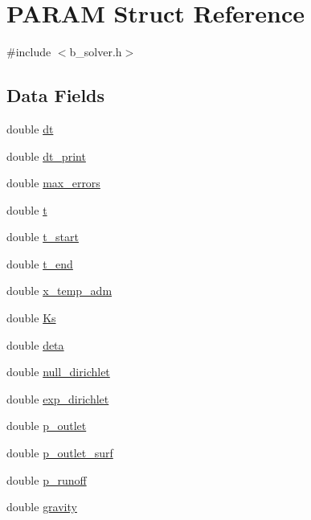 \hypertarget{struct_p_a_r_a_m}{\section{P\-A\-R\-A\-M Struct Reference}
\label{struct_p_a_r_a_m}
}


{\ttfamily \#include $<$b\-\_\-solver.\-h$>$}

\subsection*{Data Fields}
\begin{DoxyCompactItemize}
\item 
double \hyperlink{struct_p_a_r_a_m_a0348912407bf4a61261b92feccdaf092}{dt}
\item 
double \hyperlink{struct_p_a_r_a_m_af11d7ff309c45584f064aaf31ce0bfae}{dt\-\_\-print}
\item 
double \hyperlink{struct_p_a_r_a_m_ac69e7b750bf4a304aa03871456e5345d}{max\-\_\-errors}
\item 
double \hyperlink{struct_p_a_r_a_m_a8a3cde045b4e45360640476e83c239d8}{t}
\item 
double \hyperlink{struct_p_a_r_a_m_a50360071f78d7a9b7a009e6efc6c82cb}{t\-\_\-start}
\item 
double \hyperlink{struct_p_a_r_a_m_a93e536551277d6840879ceb33bb20a33}{t\-\_\-end}
\item 
double \hyperlink{struct_p_a_r_a_m_a0b65307c9584f0783adc40141903c39a}{x\-\_\-temp\-\_\-adm}
\item 
double \hyperlink{struct_p_a_r_a_m_a67b007dbf2132a03148c0a8407348e98}{Ks}
\item 
double \hyperlink{struct_p_a_r_a_m_af23ff99642425900011aff1b51438e43}{deta}
\item 
double \hyperlink{struct_p_a_r_a_m_a0ed670f674e3fdb1657eb6c40aed2a75}{null\-\_\-dirichlet}
\item 
double \hyperlink{struct_p_a_r_a_m_aa2aedc005e74a667c46a2c9989d4bf5c}{exp\-\_\-dirichlet}
\item 
double \hyperlink{struct_p_a_r_a_m_ab9e16ccc88b168342b0a6a2fe1bb7070}{p\-\_\-outlet}
\item 
double \hyperlink{struct_p_a_r_a_m_a4fa2089e6333f92dec67602b9c2bdcf1}{p\-\_\-outlet\-\_\-surf}
\item 
double \hyperlink{struct_p_a_r_a_m_a6c7a02f7ff4c8f020d305d75d41bedb1}{p\-\_\-runoff}
\item 
double \hyperlink{struct_p_a_r_a_m_a95eea229cd995b9c3495257154c5d22f}{gravity}
\end{DoxyCompactItemize}


